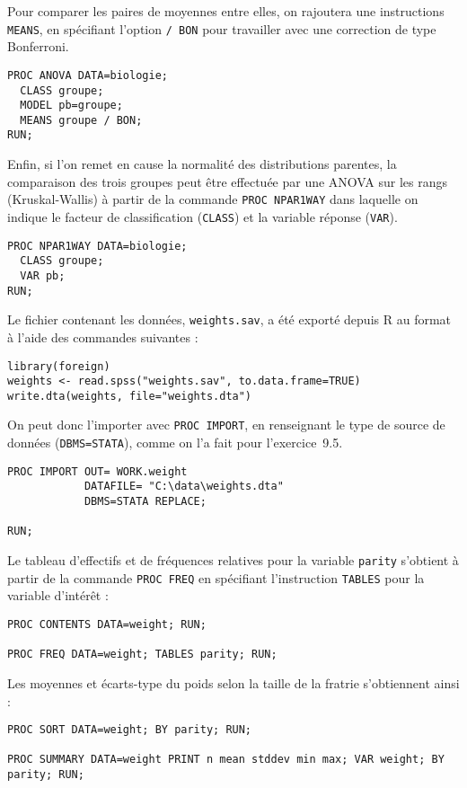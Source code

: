 Pour comparer les paires de moyennes entre elles, on rajoutera une
instructions \texttt{MEANS}, en spécifiant l'option \verb|/ BON| pour
travailler avec une correction de type Bonferroni.
\begin{verbatim}
PROC ANOVA DATA=biologie; 
  CLASS groupe; 
  MODEL pb=groupe;
  MEANS groupe / BON;
RUN;
\end{verbatim}

Enfin, si l'on remet en cause la normalité des distributions parentes, la
comparaison des trois groupes peut être effectuée par une ANOVA sur les
rangs (Kruskal-Wallis) à partir de la commande \texttt{PROC NPAR1WAY} dans
laquelle on indique le facteur de classification (\texttt{CLASS}) et la
variable réponse (\texttt{VAR}).
\begin{verbatim}
PROC NPAR1WAY DATA=biologie; 
  CLASS groupe; 
  VAR pb; 
RUN;
\end{verbatim}
%
%
%
\soln{\ref{exo:9.7}}
Le fichier contenant les données, \texttt{weights.sav}, a été exporté depuis
R au format \Stata à l'aide des commandes suivantes :
\begin{verbatim}
library(foreign)
weights <- read.spss("weights.sav", to.data.frame=TRUE)
write.dta(weights, file="weights.dta")
\end{verbatim}
On peut donc l'importer avec \texttt{PROC IMPORT}, en renseignant le type de
source de données (\texttt{DBMS=STATA}), comme on l'a fait pour l'exercice~9.5.
\begin{verbatim}
PROC IMPORT OUT= WORK.weight
            DATAFILE= "C:\data\weights.dta"
            DBMS=STATA REPLACE;

RUN;
\end{verbatim}

Le tableau d'effectifs et de fréquences relatives pour la variable
\texttt{parity} s'obtient à partir de la commande \texttt{PROC FREQ} en
spécifiant l'instruction \texttt{TABLES} pour la variable d'intérêt :
\begin{verbatim}
PROC CONTENTS DATA=weight; RUN;

PROC FREQ DATA=weight; TABLES parity; RUN;
\end{verbatim}

Les moyennes et écarts-type du poids selon la taille de la fratrie
s'obtiennent ainsi :
\begin{verbatim}
PROC SORT DATA=weight; BY parity; RUN;

PROC SUMMARY DATA=weight PRINT n mean stddev min max; VAR weight; BY parity; RUN;
\end{verbatim}


